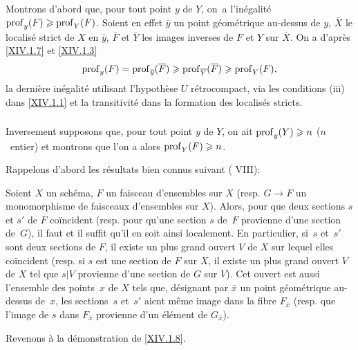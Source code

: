 \subsubsection{} \label{XIV.1.8.1} Montrons d'abord que, pour tout point $y$ de $Y$, on~a l'in\'egalit\'e $\operatorname{prof}_y(F)\geqslant \operatorname{prof}_Y(F)$. Soient en effet $\bar y$ un point g\'eom\'etrique au-dessus de $y$, $\bar X$ le localis\'e strict de $X$ en $\bar y$, $\bar F$ et $\bar Y$ les images inverses de $F$ et $Y$ sur $\bar X$. On a d'apr\`es \ref{XIV.1.7} et \ref{XIV.1.3}
$$
\operatorname{prof}_y(F)=\operatorname{prof}_{\overline y}(\overline F)\geqslant \operatorname{prof}_{\overline Y}(\overline F)\geqslant \operatorname{prof}_Y(F),
$$
la derni\`ere in\'egalit\'e utilisant l'hypoth\`ese \og $U$ r\'etrocompact\fg, via les conditions \textup{(iii)} dans \ref{XIV.1.1} et la transitivit\'e dans la formation des localis\'es stricts.

\subsubsection{} \label{XIV.1.8.2}
Inversement supposons que, pour tout point $y$ de $Y$, on ait $\operatorname{prof}_y(Y)\geqslant n$ ($n$~entier) et montrons que l'on a alors $\operatorname{prof}_Y(F)\geqslant n$.

Rappelons d'abord les r\'esultats bien connus suivant \textup{( VIII)}:

\begin{subsublemme} \label{XIV.1.8.2.1}
Soient $X$ un sch\'ema, $F$ un faisceau d'ensembles sur $X$ (resp. $G\to F$ un monomorphisme de faisceaux d'ensembles sur $X$). Alors, pour que deux sections $s$ et $s'$ de $F$ co\"incident (resp. pour qu'une section $s$ de~$F$ provienne d'une section de~$G$), il faut et il suffit qu'il en soit ainsi localement. En particulier, si~$s$ et~$s'$ sont deux sections de $F$, il existe un plus grand ouvert $V$ de $X$ sur lequel elles co\"incident (resp. si $s$ est une section de $F$ sur $X$, il existe un plus grand ouvert $V$ de $X$ tel que $s|V$ provienne d'une section de $G$ sur $V$). Cet ouvert est aussi l'ensemble des points~$x$ de $X$ tels que, d\'esignant par $\bar x$ un point g\'eom\'etrique au-dessus de~$x$, les sections~$s$ et~$s'$ aient m\^eme image dans la fibre $F_{\bar x}$ (resp. que l'image de $s$ dans $F_{\bar x}$ provienne d'un \'el\'ement de $G_{\bar x}$).
\end{subsublemme}

Revenons \`a la d\'emonstration de \ref{XIV.1.8}.

